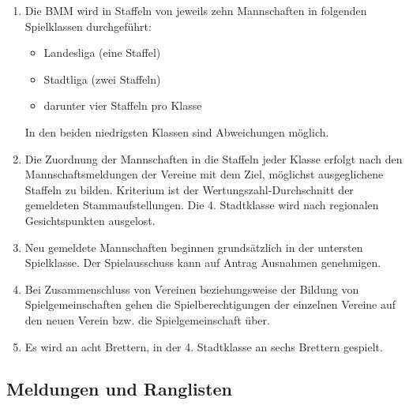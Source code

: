 \documentclass[fontsize=12pt, paper=a4, ngerman]{article}
\begin{document}
\begin{enumerate}
\item Die BMM wird in Staffeln von jeweils zehn Mannschaften in folgenden Spielklassen durchgeführt:
  \begin{itemize}
  \item Landesliga (eine Staffel)
  \item Stadtliga (zwei Staffeln)
  \item darunter vier Staffeln pro Klasse
  \end{itemize}
In den beiden niedrigsten Klassen sind Abweichungen möglich.
\item Die Zuordnung der Mannschaften in die Staffeln jeder Klasse erfolgt nach den Mannschaftsmeldungen der Vereine mit dem Ziel, möglichst ausgeglichene Staffeln zu bilden.
Kriterium ist der Wertungszahl-Durchschnitt der gemeldeten Stammaufstellungen. Die 4. Stadtklasse wird nach regionalen Gesichtspunkten ausgelost.
\item Neu gemeldete Mannschaften beginnen grundsätzlich in der untersten Spielklasse. Der Spielausschuss kann auf Antrag Ausnahmen genehmigen.
\item Bei Zusammenschluss von Vereinen beziehungsweise der Bildung von Spielgemeinschaften gehen die Spielberechtigungen der einzelnen Vereine auf den neuen Verein bzw. die
Spielgemeinschaft über.
\item Es wird an acht Brettern, in der 4. Stadtklasse an sechs Brettern gespielt.
\end{enumerate}

\subsection{Meldungen und Ranglisten}
\end{document}
